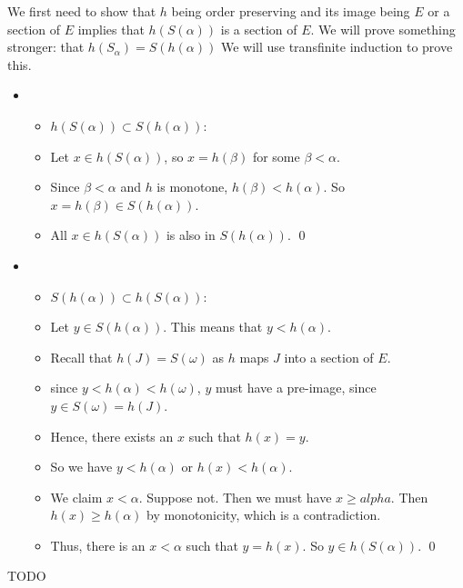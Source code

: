 \documentclass{article}
\begin{document}
We first need to show that $h$ being order preserving and its image being $E$ or a section of $E$ implies that 
$h(S(\alpha))$ is a section of $E$. We will prove something stronger:
that $h(S_\alpha) = S(h(\alpha))$ We will use transfinite induction to prove this.
\begin{itemize}
    \item 
        \begin{itemize}
            \item $h(S(\alpha)) \subset S(h(\alpha))$:
            \item Let $x \in h(S(\alpha))$, so $x = h(\beta)$ for some $\beta < \alpha$.
            \item Since $\beta < \alpha$ and $h$ is monotone, $h(\beta) < h(\alpha)$. So $x = h(\beta) \in S(h(\alpha))$.
            \item All $x \in h(S(\alpha))$ is also in $S(h(\alpha))$. \qed
        \end{itemize}
    \item 
        \begin{itemize}
                \item $S(h(\alpha)) \subset h(S(\alpha))$:
                \item Let $y \in S(h(\alpha))$. This means that $y < h(\alpha)$.
                \item Recall that $h(J) = S(\omega)$ as $h$ maps $J$ into a section of $E$.
                \item since $y < h(\alpha) < h(\omega)$, $y$ must have a pre-image, since $y \in S(\omega) = h(J)$.
                \item Hence, there exists an $x$ such that $h(x) = y$.
                \item So we have $y < h(\alpha)$ or $h(x) < h(\alpha)$.
                \item We claim $x < \alpha$. Suppose not. Then we must have $x
                    \geq alpha$.  Then $h(x) \geq h(\alpha)$ by monotonicity,
                    which is a contradiction.
                \item Thus, there is an $x < \alpha$ such that $y = h(x)$. So $y \in h(S(\alpha))$. \qed
        \end{itemize}

\end{itemize}

 TODO
\end{document}
